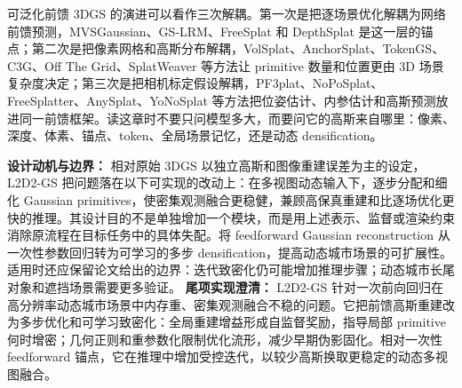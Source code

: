 可泛化前馈 3DGS 的演进可以看作三次解耦。第一次是把逐场景优化解耦为网络前馈预测，MVSGaussian、GS-LRM、FreeSplat 和 DepthSplat 是这一层的锚点；第二次是把像素网格和高斯分布解耦，VolSplat、AnchorSplat、TokenGS、C3G、Off The Grid、SplatWeaver 等方法让 primitive 数量和位置更由 3D 场景复杂度决定；第三次是把相机标定假设解耦，PF3plat、NoPoSplat、FreeSplatter、AnySplat、YoNoSplat 等方法把位姿估计、内参估计和高斯预测放进同一前馈框架。读这章时不要只问模型多大，而要问它的高斯来自哪里：像素、深度、体素、锚点、token、全局场景记忆，还是动态 densification。

\textbf{设计动机与边界：} 相对原始 3DGS 以独立高斯和图像重建误差为主的设定，L2D2-GS 把问题落在以下可实现的改动上：在多视图动态输入下，逐步分配和细化 Gaussian primitives，使密集观测融合更稳健，兼顾高保真重建和比逐场优化更快的推理。其设计目的不是单独增加一个模块，而是用上述表示、监督或渲染约束消除原流程在目标任务中的具体失配。将 feedforward Gaussian reconstruction 从一次性参数回归转为可学习的多步 densification，提高动态城市场景的可扩展性。适用时还应保留论文给出的边界：迭代致密化仍可能增加推理步骤；动态城市长尾对象和遮挡场景需要更多验证。
\textbf{尾项实现澄清：} L2D2-GS 针对一次前向回归在高分辨率动态城市场景中内存重、密集观测融合不稳的问题。它把前馈高斯重建改为多步优化和可学习致密化：全局重建增益形成自监督奖励，指导局部 primitive 何时增密；几何正则和重参数化限制优化流形，减少早期伪影固化。相对一次性 feedforward 锚点，它在推理中增加受控迭代，以较少高斯换取更稳定的动态多视图融合。
